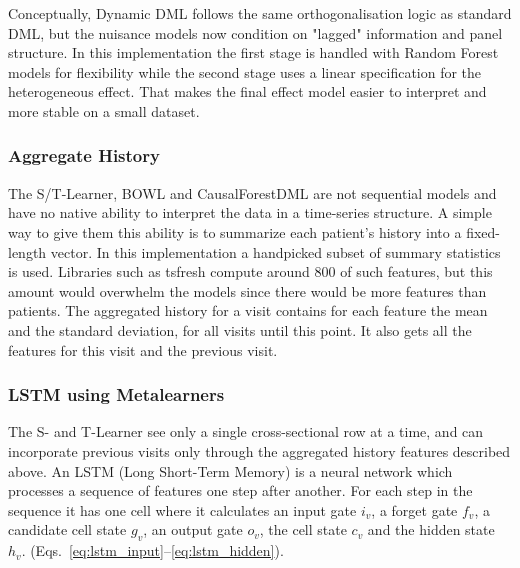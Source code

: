\documentclass{article}
\begin{document}
Conceptually, Dynamic DML follows the same orthogonalisation logic as standard DML, but the nuisance models now condition on "lagged" information and panel structure. In this implementation the first stage is handled with Random Forest models for flexibility while the second stage uses a linear specification for the heterogeneous effect. That makes the final effect model easier to interpret and more stable on a small dataset.

\subsubsection*{Aggregate History}
The S/T-Learner, BOWL and  CausalForestDML are not sequential models and have no native ability to interpret the data in a time-series structure. A simple way to give them this ability is to summarize each patient's history into a fixed-length vector. In this implementation a handpicked subset of summary statistics is used. Libraries such as tsfresh compute around 800 of such features\cite{CHRIST201872}, but this amount would overwhelm the models since there would be more features than patients.
The aggregated history for a visit contains for each feature the mean and the standard deviation, for all visits until this point.
It also gets all the features for this visit and the previous visit.

\subsubsection*{LSTM using Metalearners}
The S- and T-Learner see only a single cross-sectional row at a time, and can incorporate previous visits only through the aggregated history features described above. An LSTM (Long Short-Term Memory) is a neural network which processes a sequence of features one step after another. For each step in the sequence it has one cell where it calculates an input gate $i_v$, a forget gate $f_v$, 
a candidate cell state $g_v$, an output gate $o_v$, the cell state 
$c_v$ and the hidden state $h_v$. (Eqs.~\eqref{eq:lstm_input}--\eqref{eq:lstm_hidden}).\cite{pytorch_lstm}
\end{document}
